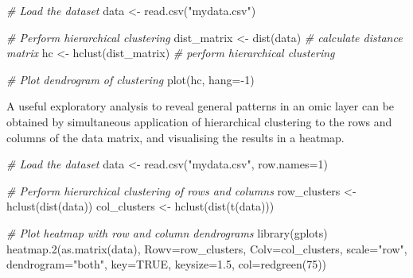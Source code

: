 \documentclass[
]{book}
\newenvironment{Shaded}{\begin{snugshade}}{\end{snugshade}}
\newcommand{\AttributeTok}[1]{\textcolor[rgb]{0.77,0.63,0.00}{#1}}
\newcommand{\CommentTok}[1]{\textcolor[rgb]{0.56,0.35,0.01}{\textit{#1}}}
\newcommand{\ConstantTok}[1]{\textcolor[rgb]{0.00,0.00,0.00}{#1}}
\newcommand{\DecValTok}[1]{\textcolor[rgb]{0.00,0.00,0.81}{#1}}
\newcommand{\FloatTok}[1]{\textcolor[rgb]{0.00,0.00,0.81}{#1}}
\newcommand{\FunctionTok}[1]{\textcolor[rgb]{0.00,0.00,0.00}{#1}}
\newcommand{\NormalTok}[1]{#1}
\newcommand{\OtherTok}[1]{\textcolor[rgb]{0.56,0.35,0.01}{#1}}
\newcommand{\SpecialCharTok}[1]{\textcolor[rgb]{0.00,0.00,0.00}{#1}}
\newcommand{\StringTok}[1]{\textcolor[rgb]{0.31,0.60,0.02}{#1}}
\begin{document}
\small

\begin{Shaded}
\begin{Highlighting}[]
\CommentTok{\# Load the dataset}
\NormalTok{data }\OtherTok{\textless{}{-}} \FunctionTok{read.csv}\NormalTok{(}\StringTok{"mydata.csv"}\NormalTok{)}

\CommentTok{\# Perform hierarchical clustering}
\NormalTok{dist\_matrix }\OtherTok{\textless{}{-}} \FunctionTok{dist}\NormalTok{(data)  }\CommentTok{\# calculate distance matrix}
\NormalTok{hc }\OtherTok{\textless{}{-}} \FunctionTok{hclust}\NormalTok{(dist\_matrix)  }\CommentTok{\# perform hierarchical clustering}

\CommentTok{\# Plot dendrogram of clustering}
\FunctionTok{plot}\NormalTok{(hc, }\AttributeTok{hang=}\SpecialCharTok{{-}}\DecValTok{1}\NormalTok{)}
\end{Highlighting}
\end{Shaded}

\normalsize

A useful exploratory analysis to reveal general patterns in an omic layer can be obtained by simultaneous application of hierarchical clustering to the rows and columns of the data matrix, and visualising the results in a heatmap.

\small

\begin{Shaded}
\begin{Highlighting}[]
\CommentTok{\# Load the dataset}
\NormalTok{data }\OtherTok{\textless{}{-}} \FunctionTok{read.csv}\NormalTok{(}\StringTok{"mydata.csv"}\NormalTok{, }\AttributeTok{row.names=}\DecValTok{1}\NormalTok{)}

\CommentTok{\# Perform hierarchical clustering of rows and columns}
\NormalTok{row\_clusters }\OtherTok{\textless{}{-}} \FunctionTok{hclust}\NormalTok{(}\FunctionTok{dist}\NormalTok{(data))}
\NormalTok{col\_clusters }\OtherTok{\textless{}{-}} \FunctionTok{hclust}\NormalTok{(}\FunctionTok{dist}\NormalTok{(}\FunctionTok{t}\NormalTok{(data)))}

\CommentTok{\# Plot heatmap with row and column dendrograms}
\FunctionTok{library}\NormalTok{(gplots)}
\FunctionTok{heatmap.2}\NormalTok{(}\FunctionTok{as.matrix}\NormalTok{(data),}
          \AttributeTok{Rowv=}\NormalTok{row\_clusters,}
          \AttributeTok{Colv=}\NormalTok{col\_clusters,}
          \AttributeTok{scale=}\StringTok{"row"}\NormalTok{,}
          \AttributeTok{dendrogram=}\StringTok{"both"}\NormalTok{,}
          \AttributeTok{key=}\ConstantTok{TRUE}\NormalTok{,}
          \AttributeTok{keysize=}\FloatTok{1.5}\NormalTok{,}
          \AttributeTok{col=}\FunctionTok{redgreen}\NormalTok{(}\DecValTok{75}\NormalTok{))}
\end{Highlighting}
\end{Shaded}
\end{document}
